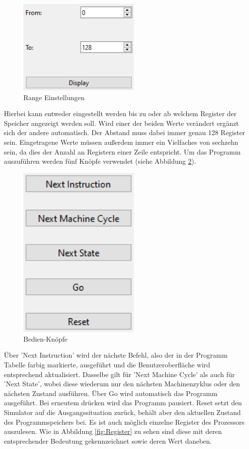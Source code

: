 \documentclass[12pt]{article}
\newcommand{\imgSpaceBefore}{\vspace{10pt}}
\begin{document}
\begin{figure}[h]
\centering
\includegraphics[width=6cm]{bilder/Range}
\caption{Range Einstellungen}
\label{fig:Range}
\end{figure}

\noindent
Hierbei kann entweder eingestellt werden bis zu oder ab welchem Register der Speicher angezeigt werden soll. Wird einer der beiden Werte verändert ergänzt sich der andere automatisch. Der Abstand muss dabei immer genau 128 Register sein. Eingetragene Werte müssen außerdem immer ein Vielfaches von sechzehn sein, da dies der Anzahl an Registern einer Zeile entspricht. Um das Programm auszuführen werden fünf Knöpfe verwendet (siehe Abbildung \ref{fig:Bedienen}).\imgSpaceBefore

\begin{figure}[H]
\centering
\includegraphics[width=6cm]{bilder/Bedienen}
\caption{Bedien-Knöpfe}
\label{fig:Bedienen}
\end{figure}

\noindent
Über 'Next Instruction' wird der nächste Befehl, also der in der Programm Tabelle farbig markierte, ausgeführt und die Benutzeroberfläche wird entsprechend aktualisiert. Dasselbe gilt für 'Next Machine Cycle' als auch für 'Next State', wobei diese wiederum nur den nächsten Machinenzyklus oder den nächsten Zustand ausführen. Über Go wird automatisch das Programm ausgeführt. Bei erneutem drücken wird das Programm pausiert. Reset setzt den Simulator auf die Ausgangssituation zurück, behält aber den aktuellen Zustand des Programmspeichers bei. Es ist auch möglich einzelne Register des Prozessors auszulesen. Wie in Abbildung \ref{fig:Register} zu sehen sind diese mit deren entsprechender Bedeutung gekennzeichnet sowie deren Wert daneben.\imgSpaceBefore
\end{document}
